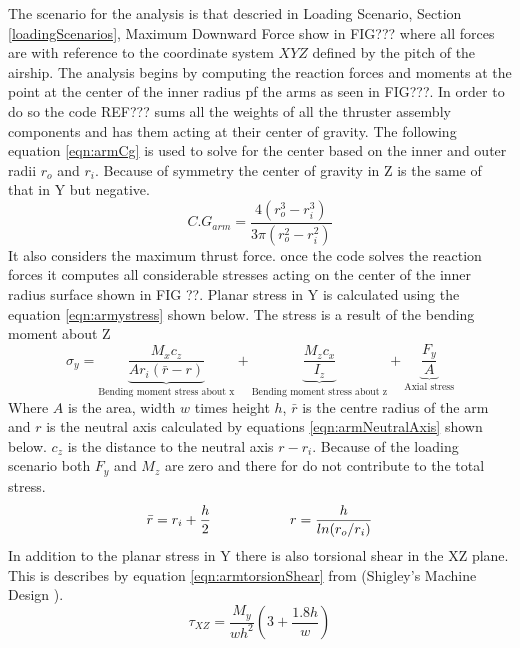 \documentclass[../main.tex]{subfiles}
\begin{document}
The scenario for the analysis is that descried in Loading Scenario, Section \ref{loadingScenarios}, Maximum Downward Force show in FIG??? where all forces are with reference to the coordinate system $XYZ$ defined by the pitch of the airship. The analysis begins by computing the reaction forces and moments at the point at the center of the inner radius pf the arms as seen in FIG???. In order to do so the code REF??? sums all the weights of all the thruster assembly components and has them acting at their center of gravity. The following equation \ref{eqn:armCg} is used to solve for the center based on the inner and outer radii $r_o$ and $r_i$. Because of symmetry the center of gravity in Z is the same of that in Y but negative. 
\begin{equation} \label{eqn:armCg}
C.G_{arm} =\frac{4(r_o^3 - r_i^3)}{3\pi(r_o^2 - r_i^2)}
\end{equation}
It also considers the maximum thrust force. once the code solves the reaction forces it computes all considerable stresses acting on the center of the inner radius surface shown in FIG ??. Planar stress in Y is calculated using the equation \ref{eqn:armystress} shown below. The stress is a result of the bending moment about Z
\begin{equation}
\label{eqn:armystress}
\sigma_{y}=  \underbrace{\frac{M_{x}c_z}{A r_i (\bar{r} - r)}}_\text{Bending moment stress about x} + \underbrace{\frac{M_{z}c_x}{I_z}}_\text{Bending moment stress about z} + \underbrace{\frac{F_y}{A}}_\text{Axial stress} 
\end{equation}
Where $A$ is the area, width $w$ times height $h$, $\bar{r}$ is the centre radius of the arm and $r$ is the neutral axis calculated by equations \ref{eqn:armNeutralAxis} shown below. $c_z$ is the distance to the neutral axis $r - r_i$. Because of the loading scenario both $F_y$ and $M_z$ are zero and there for do not contribute to the total stress.
\begin{equation} \label{eqn:armNeutralAxis}
\bar{r} = r_i + \frac{h}{2} \hspace{20mm}  r = \frac{h}{ln(r_o/r_i)}
\end{equation}
In addition to the planar stress in Y there is also torsional shear in the XZ plane. This is describes by equation \ref{eqn:armtorsionShear} from {(Shigley's Machine Design \cite[102]{shigley})}.
\begin{equation} \label{eqn:armtorsionShear}
\tau_{XZ} = \dfrac{M_{y}}{wh^2}(3+\frac{1.8h}{w})
\end{equation}
\end{document}
